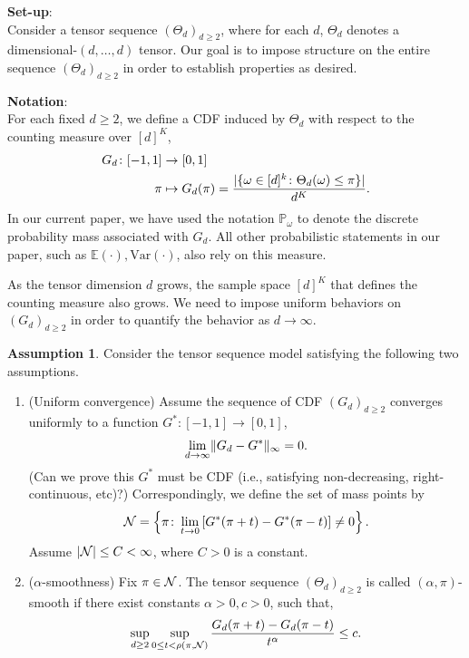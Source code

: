 \documentclass[10pt]{article}
\theoremstyle{definition}
\theoremstyle{definition}
\newtheorem{assumption}{Assumption}
\theoremstyle{definition}
\begin{document}
\begin{enumerate}
{\bf Set-up}: \\
Consider a tensor sequence $(\Theta_d)_{d\geq 2}$, where for each $d$, $\Theta_d$ denotes a dimensional-$(d,\ldots,d)$ tensor. Our goal is to impose structure on the entire sequence $(\Theta_d)_{d\geq 2}$ in order to establish properties as desired. 

{\bf Notation}:\\
For each fixed $d\geq 2$, we define a CDF induced by $\Theta_d$ with respect to the counting measure over $[d]^K$, 
\begin{align}
G_d \colon [-1,1] & \to [0,1]\\
 \pi &\mapsto G_d(\pi)={|\{\omega\in[d]^k \colon \Theta_d(\omega)\leq \pi\}| \over d^K}.
\end{align}
In our current paper, we have used the notation $\mathbb{P}_{\omega}$ to denote the discrete probability mass associated with $G_d$. All other probabilistic statements in our paper, such as $\mathbb{E}(\cdot), \text{Var}(\cdot)$, also rely on this measure. 


As the tensor dimension $d$ grows, the sample space $[d]^K$ that defines the counting measure also grows. We need to impose uniform behaviors on $(G_d)_{d\geq 2}$ in order to quantify the behavior as $d\to \infty$. 

\begin{assumption} Consider the tensor sequence model satisfying the following two assumptions. \hfill
\begin{enumerate}
\item (Uniform convergence) Assume the sequence of CDF $(G_d)_{d\geq 2}$ converges uniformly to a function $G^*:[-1,1]\to[0,1]$,
\[
\lim_{d\to\infty}\lVert G_d-G^*\rVert_\infty = 0.
\]
({\color{red}Can we prove this $G^*$ must be CDF (i.e., satisfying non-decreasing, right-continuous, etc)?}) Correspondingly, we define the set of mass points by
\[
\mathcal{N}=\left\{\pi\colon \lim_{t\to 0}\left[G^*(\pi+t)-G^*(\pi-t)\right] \neq 0\right\}.
\]
Assume $|\mathcal{N}|\leq C<\infty$, where $C>0$ is a constant. 
\item ($\alpha$-smoothness) Fix $\pi\in\mathcal{N}$. The tensor sequence $(\Theta_d)_{d\geq 2}$ is called $(\alpha,\pi)$-smooth if there exist constants $\alpha>0, c>0$, such that,
\[
\sup_{d\geq 2}\sup_{0\leq t<\rho(\pi,\mathcal{N})} {G_d(\pi+t)-G_d(\pi-t)\over t^\alpha} \leq c.
\]
\end{enumerate}
\end{assumption}



\end{enumerate}
\end{document}
